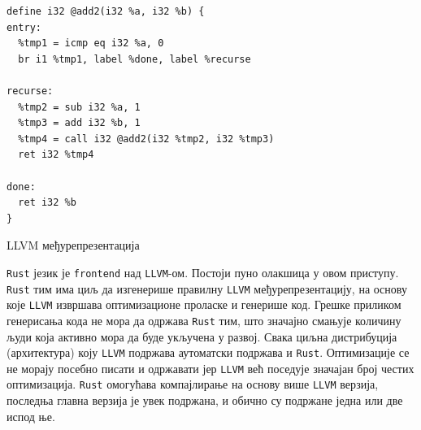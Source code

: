 \begin{listing}[H]
\begin{verbatim}
define i32 @add2(i32 %a, i32 %b) {
entry:
  %tmp1 = icmp eq i32 %a, 0
  br i1 %tmp1, label %done, label %recurse

recurse:
  %tmp2 = sub i32 %a, 1
  %tmp3 = add i32 %b, 1
  %tmp4 = call i32 @add2(i32 %tmp2, i32 %tmp3)
  ret i32 %tmp4

done:
  ret i32 %b
}
\end{verbatim}
\caption{LLVM међурепрезентација}
\label{lst:llvm_ir}
\end{listing}

\verb|Rust| језик је \verb|frontend| над \verb|LLVM|-ом. Постоји пуно олакшица у овом приступу.
\verb|Rust| тим има циљ да изгенерише правилну \verb|LLVM| међурепрезентацију, на основу које 
\verb|LLVM| извршава оптимизационе проласке и генерише код. Грешке приликом генерисања кода не мора да 
одржава \verb|Rust| тим, што значајно смањује количину људи која активно мора да буде укључена у развој. 
Свака циљна дистрибуција (архитектура) коју \verb|LLVM| подржава аутоматски подржава и \verb|Rust|. Оптимизације се не морају 
посебно писати и одржавати јер \verb|LLVM| већ поседује значајан број честих оптимизација. \verb|Rust| 
омогућава компајлирање на основу више \verb|LLVM| верзија, последња главна верзија је увек подржана,
и обично су подржане једна или две испод ње.

